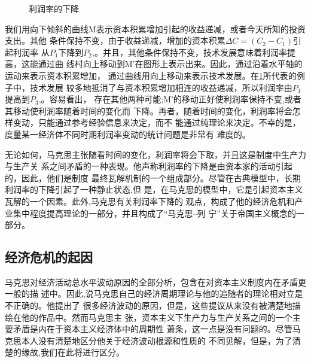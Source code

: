 \begin{figure}[ht]
  \centering
{}%
  \caption{\label{fig:marxlirun}利润率的下降 }
\end{figure}

我们用向下倾斜的曲线M表示资本积累增加引起的收益递减，或者今天所知的投资支出。其他
条件保持不变，由于收益递减，增加的资本积累$\Delta C=(C_2 - C_1)$引起利润率
从$P_1$下降到$P_2$,。并且，其他条件保持不变，技术发展意味着利润率提高，这能通过曲
线村向上移动到M'在图形上表示出来。因此，通过沿着水平轴的运动来表示资本积累增加，
通过曲线用向上移动来表示技术发展。在\cref{fig:marxlirun}所代表的例子中，技术发展
较多地抵消了与资本积累增加相连的收益递减，所以利润率由$P_1$提高到$P_3$,。容易看出，
存在其他两种可能;M'的移动正好使利润率保持不变,或者其移动使利润率随着时间的变化而
下降。再者，随着时间的变化，利润率将会怎样变动，只能通过参考经验信息来决定，而不
能通过纯理论来决定。不幸的是，度量某一经济体不同时期利润率变动的统计问题是非常有
难度的。


无论如何，马克思主张随看时间的变化，利润率将会下取，并且这是制度中生产力与生产关
系之间矛盾的一种表现。他声称利润率的下降是由资本家的活动引起的，因此，他们是制度
最终瓦解机制的一个组成部分。尽管在古典模型中，长期利润率的下降引起了一种静止状态,但
是，在马克思的模型中，它是引起资本主义瓦解的一个因素。此外,马克思有关利润率下降的
观点，构成了他的经济危机和产业集中程度提高理论的一部分，并且构成了“马克思--列
宁”关于帝国主义概念的一部分。

\subsection{经济危机的起因}

马克思对经济活动总水平波动原因的全部分析，包含在对资本主义制度内在矛盾更一般的描
述中。因此,说马克思自己的经济周期理论与他的追随者的理论相对立是不正确的。他提出了
很多经济波动的原因，但是，这些提议从来没有被清楚地描绘在他的作品中。然而马克思主
张，资本主义下生产力与生产关系之间的一个主要矛盾是内在于资本主义经济体中的周期性
萧条，这一点是没有问题的。尽管马克思本人没有清楚地区分他关于经济波动根源和性质的
不同见解，但是，为了清楚的缘故,我们在此将进行区分。

